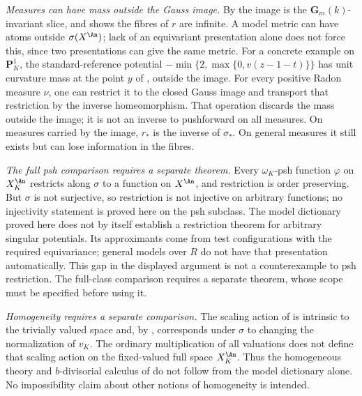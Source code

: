\emph{Measures can have mass outside the Gauss image.}  By  the image is the
$\mathbf G_m(k)$-invariant slice, and
 shows the fibres of $r$ are infinite.
A model metric can have atoms outside $\sigma(X^{\An})$; lack of an
equivariant presentation alone does not force this, since two presentations
can give the same metric.  For a concrete example on $\mathbf P^1_K$,
the standard-reference potential
$-\min\{2,\max\{0,v(z-1-t)\}\}$ has unit curvature mass at the point
$y$ of , outside the image.
For every positive Radon measure $\nu$, one can restrict it to the closed
Gauss image and transport that restriction by the inverse homeomorphism.
That operation discards the mass outside the image; it is not an inverse
to pushforward on all measures.  On measures carried by the image,
$r_*$ is the inverse of $\sigma_*$.  On general measures it still exists
but can lose information in the fibres.

\emph{The full psh comparison requires a separate theorem.}
Every $\omega_K$-psh function $\varphi$ on $X_K^{\An}$ restricts along
$\sigma$ to a function on $X^{\An}$, and restriction is order preserving.
But $\sigma$ is not surjective, so restriction is not injective on
arbitrary functions; no injectivity statement is proved here on the psh
subclass.  The model dictionary proved here does not by itself establish a
restriction theorem for arbitrary singular potentials.  Its approximants
come from test configurations with the required equivariance; general
models over $R$ do not have that presentation automatically.
This gap in the displayed argument is not a counterexample to psh
restriction.  The full-class comparison requires a separate theorem,
whose scope must be specified before using it.

\emph{Homogeneity requires a separate comparison.}  The scaling action of
 is intrinsic to the trivially valued
space and, by , corresponds under $\sigma$
to changing the normalization of $v_K$.  The ordinary multiplication of all valuations does not define that
scaling action on the fixed-valued full space $X_K^{\An}$.
Thus the homogeneous theory and $b$-divisorial calculus of
 do not follow from the model
dictionary alone.  No impossibility claim about other notions of
homogeneity is intended.

